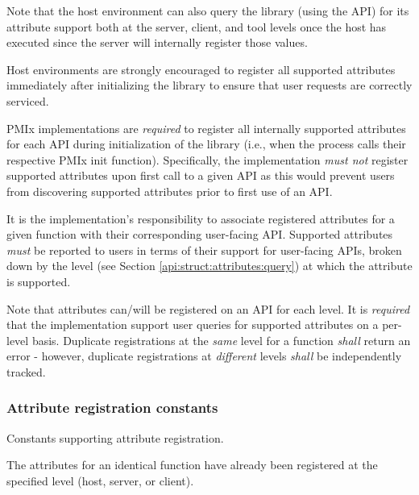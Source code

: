 Note that the host environment can also query the library (using the  \ac{API}) for its attribute support both at the server, client, and tool levels once the host has executed  since the server will internally register those values.

\advicermstart
Host environments are strongly encouraged to register all supported attributes immediately after initializing the library to ensure that user requests are correctly serviced.
\advicermend

\adviceimplstart
\ac{PMIx} implementations are \emph{required} to register all internally supported attributes for each \ac{API} during initialization of the library (i.e., when the process calls their respective \ac{PMIx} init function). Specifically, the implementation \emph{must not} register supported attributes upon first call to a given \ac{API} as this would prevent users from discovering supported attributes prior to first use of an \ac{API}.

It is the implementation's responsibility to associate registered attributes for a given  function with their corresponding user-facing \ac{API}. Supported attributes \emph{must} be reported to users in terms of their support for user-facing \acp{API}, broken down by the level (see Section \ref{api:struct:attributes:query}) at which the attribute is supported.

Note that attributes can/will be registered on an \ac{API} for each level. It is \emph{required} that the implementation support user queries for supported attributes on a per-level basis. Duplicate registrations at the \emph{same} level for a function \emph{shall} return an error - however, duplicate registrations at \emph{different} levels \emph{shall} be independently tracked.
\adviceimplend


\subsubsection{Attribute registration constants}

Constants supporting attribute registration.

\begin{constantdesc}
%
The attributes for an identical function have already been registered at the specified level (host, server, or client).
%
\end{constantdesc}


